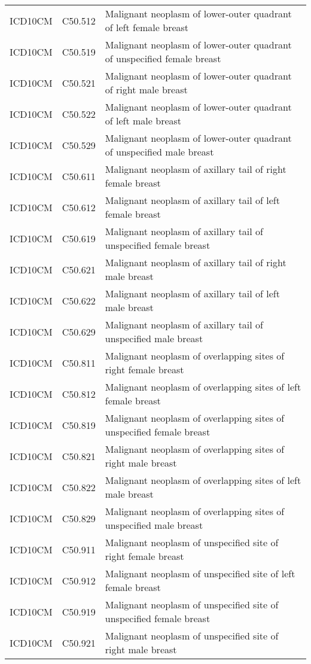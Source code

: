 \begin{longtable}{p{}p{}p{}}
  ICD10CM & C50.512 & Malignant neoplasm of lower-outer quadrant of left female breast \\ 
  ICD10CM & C50.519 & Malignant neoplasm of lower-outer quadrant of unspecified female breast \\ 
  ICD10CM & C50.521 & Malignant neoplasm of lower-outer quadrant of right male breast \\ 
  ICD10CM & C50.522 & Malignant neoplasm of lower-outer quadrant of left male breast \\ 
  ICD10CM & C50.529 & Malignant neoplasm of lower-outer quadrant of unspecified male breast \\ 
  ICD10CM & C50.611 & Malignant neoplasm of axillary tail of right female breast \\ 
  ICD10CM & C50.612 & Malignant neoplasm of axillary tail of left female breast \\ 
  ICD10CM & C50.619 & Malignant neoplasm of axillary tail of unspecified female breast \\ 
  ICD10CM & C50.621 & Malignant neoplasm of axillary tail of right male breast \\ 
  ICD10CM & C50.622 & Malignant neoplasm of axillary tail of left male breast \\ 
  ICD10CM & C50.629 & Malignant neoplasm of axillary tail of unspecified male breast \\ 
  ICD10CM & C50.811 & Malignant neoplasm of overlapping sites of right female breast \\ 
  ICD10CM & C50.812 & Malignant neoplasm of overlapping sites of left female breast \\ 
  ICD10CM & C50.819 & Malignant neoplasm of overlapping sites of unspecified female breast \\ 
  ICD10CM & C50.821 & Malignant neoplasm of overlapping sites of right male breast \\ 
  ICD10CM & C50.822 & Malignant neoplasm of overlapping sites of left male breast \\ 
  ICD10CM & C50.829 & Malignant neoplasm of overlapping sites of unspecified male breast \\ 
  ICD10CM & C50.911 & Malignant neoplasm of unspecified site of right female breast \\ 
  ICD10CM & C50.912 & Malignant neoplasm of unspecified site of left female breast \\ 
  ICD10CM & C50.919 & Malignant neoplasm of unspecified site of unspecified female breast \\ 
  ICD10CM & C50.921 & Malignant neoplasm of unspecified site of right male breast \\ 

\end{longtable}
